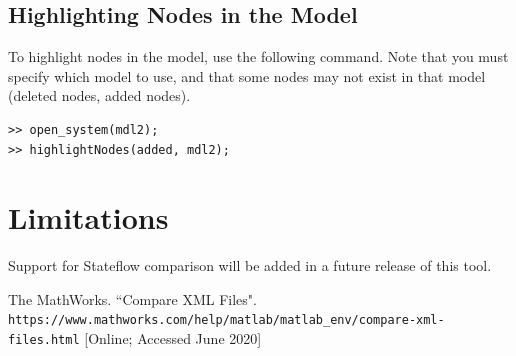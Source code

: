 \documentclass{article}
\begin{document}
\subsection{Highlighting Nodes in the Model}
To highlight nodes in the model, use the following command. Note that you must specify which model to use, and that some nodes may not exist in that model (\eg deleted nodes, added nodes).

\begin{lstlisting}
>> open_system(mdl2);
>> highlightNodes(added, mdl2);
\end{lstlisting}

\section{Limitations}
Support for Stateflow comparison will be added in a future release of this tool. 

\begin{thebibliography}{9}
The MathWorks. 
``Compare XML Files".
\\\texttt{https://www.mathworks.com/help/matlab/matlab\_env/compare-xml-files.html}
[Online; Accessed June 2020]
\end{thebibliography}
\end{document}
